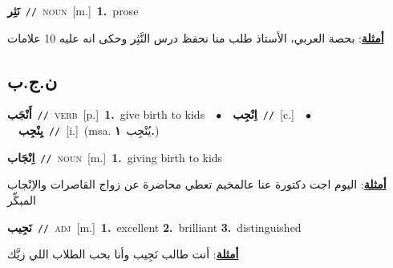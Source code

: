 \documentclass[10pt,a4paper,twoside]{article} %
\begin{document}
\begin{multicols}{2}
{\setlength\topsep{0pt}\textbf{\foreignlanguage{arabic}{نَثِر}}\ {\color{gray}\texttt{//}\color{black}}\ \textsc{noun}\ [m.]\ \textbf{1.}~prose\  \begin{flushright}\color{gray}\foreignlanguage{arabic}{\textbf{\underline{\foreignlanguage{arabic}{أمثلة}}}: بحصة العربي، الأستاذ طلب منا نحفظ درس النَّثِر وحكى انه عليه 10 علامات}\end{flushright}\color{black}} \vspace{2mm}

\vspace{-3mm}
\subsection*{\color{blue}\foreignlanguage{arabic}{ن.ج.ب}\color{blue}{}} 

{\setlength\topsep{0pt}\textbf{\foreignlanguage{arabic}{أَنْجَب}}\ {\color{gray}\texttt{//}\color{black}}\ \textsc{verb}\ [p.]\ \textbf{1.}~give birth to kids\ \ $\bullet$\ \ \setlength\topsep{0pt}\textbf{\foreignlanguage{arabic}{اِنْجِب}}\ {\color{gray}\texttt{//}\color{black}}\ [c.]\ \ $\bullet$\ \ \setlength\topsep{0pt}\textbf{\foreignlanguage{arabic}{يِنْجِب}}\ {\color{gray}\texttt{//}\color{black}}\ [i.]\ \color{gray}(msa. \foreignlanguage{arabic}{يُنْجِب}~\foreignlanguage{arabic}{\textbf{١.}})\color{black}\ } \vspace{2mm}

{\setlength\topsep{0pt}\textbf{\foreignlanguage{arabic}{اِنْجَاب}}\ {\color{gray}\texttt{//}\color{black}}\ \textsc{noun}\ [m.]\ \textbf{1.}~giving birth to kids\  \begin{flushright}\color{gray}\foreignlanguage{arabic}{\textbf{\underline{\foreignlanguage{arabic}{أمثلة}}}: اليوم اجت دكتورة عنا عالمخيم تعطي محاضرة عن زواج القاصرات والاِنْجاب المبكِّر}\end{flushright}\color{black}} \vspace{2mm}

{\setlength\topsep{0pt}\textbf{\foreignlanguage{arabic}{نَجِيب}}\ {\color{gray}\texttt{//}\color{black}}\ \textsc{adj}\ [m.]\ \textbf{1.}~excellent  \textbf{2.}~brilliant  \textbf{3.}~distinguished\  \begin{flushright}\color{gray}\foreignlanguage{arabic}{\textbf{\underline{\foreignlanguage{arabic}{أمثلة}}}: أنت طالب نَجِيب وأنا بحب الطلاب اللي زيَّك}\end{flushright}\color{black}} \vspace{2mm}


\end{multicols}
\end{document}
